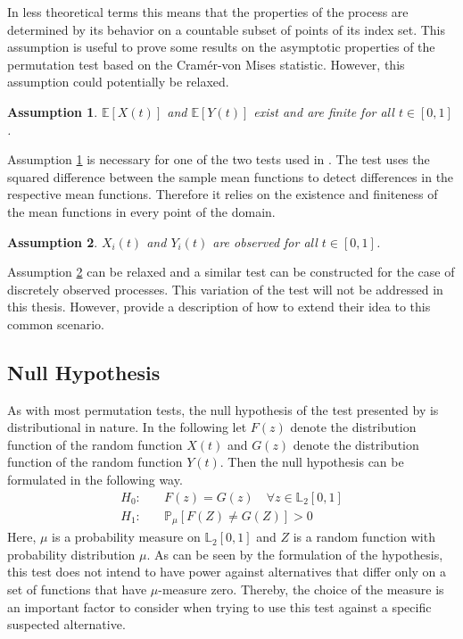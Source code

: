 \documentclass[12pt, a4paper]{article}
\theoremstyle{MAstyle} \newtheorem{assumption}{Assumption}[section]
\theoremstyle{MAstyle} \newtheorem{definition}{Definition}[section]
\theoremstyle{MAstyle} \newtheorem{theorem}{Theorem}[section]
\begin{document}
			In less theoretical terms this means that the properties of the process are determined by its behavior on a countable subset of points of its index set. This assumption is useful to prove some results on the asymptotic properties of the permutation test based on the Cram\'{e}r-von Mises statistic. However, this assumption could potentially be relaxed.
		
			\begin{assumption}\label{mean_existence}
				$\mathbb{E}\left[X(t)\right]$ and $\mathbb{E}\left[Y(t)\right]$ exist and are finite for all $t \in [0, 1]$.
			\end{assumption}
			Assumption \ref{mean_existence} is necessary for one of the two tests used in \cite{bugni_permutation_2021}. The test uses the squared difference between the sample mean functions to detect differences in the respective mean functions. Therefore it relies on the existence and finiteness of the mean functions in every point of the domain.
		
			\begin{assumption}\label{continuous_observation}
				$X_i(t)$ and $Y_i(t)$ are observed for all $t \in [0,1]$.
			\end{assumption}
			Assumption \ref{continuous_observation} can be relaxed and a similar test can be constructed for the case of discretely observed processes. This variation of the test will not be addressed in this thesis. However, \cite{bugni_permutation_2021} provide a description of how to extend their idea to this common scenario.
	
		\subsection{Null Hypothesis}
			As with most permutation tests, the null hypothesis of the test presented by \cite{bugni_permutation_2021} is distributional in nature. In the following let $F(z)$ denote the distribution function of the random function $X(t)$ and $G(z)$ denote the distribution function of the random function $Y(t)$. Then the null hypothesis can be formulated in the following way.
			\begin{equation}
				\begin{split}
					H_0: \quad &F(z) = G(z) \quad \forall z \in \mathbb{L}_2[0,1] \\
					H_1: \quad &\mathbb{P}_{\mu}\left[F(Z) \neq G(Z)\right] > 0
				\end{split}
			\end{equation}
			Here, $\mu$ is a probability measure on $\mathbb{L}_2[0,1]$ and $Z$ is a random function with probability distribution $\mu$. As can be seen by the formulation of the hypothesis, this test does not intend to have power against alternatives that differ only on a set of functions that have $\mu$-measure zero. Thereby, the choice of the measure is an important factor to consider when trying to use this test against a specific suspected alternative.  
		
\end{document}
